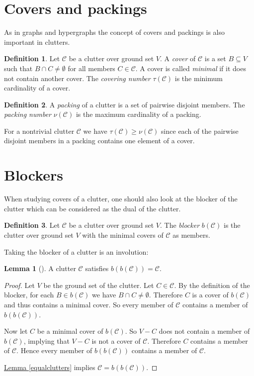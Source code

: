 \documentclass[a4paper, 12pt]{scrbook}
\theoremstyle{definition}
\newtheorem*{definition}{Definition}
\newtheorem{lemma}[theorem]{Lemma}
\begin{document}
\section{Covers and packings}
As in graphs and hypergraphs the concept of covers and packings is also important in clutters.
\begin{definition}
    Let $\mathcal{C}$ be a clutter over ground set $V$.
    A \emph{cover} of $\mathcal{C}$ is a set $B \subseteq V$ such that $B \cap C \neq \emptyset$ for all members $C \in \mathcal{C}$.
    A cover is called \emph{minimal} if it does not contain another cover.
    The \emph{covering number} $\tau(\mathcal{C})$ is the minimum cardinality of a cover.
\end{definition}

\begin{definition}
    A \emph{packing} of a clutter is a set of pairwise disjoint members.
    The \emph{packing number} $\nu(\mathcal{C})$ is the maximum cardinality of a packing.
\end{definition}

For a nontrivial clutter $\mathcal{C}$ we have $\tau(\mathcal{C}) \geq \nu(\mathcal{C})$ since each of the pairwise disjoint members in a packing contains one element of a cover.

\section{Blockers}
When studying covers of a clutter, one should also look at the blocker of the clutter which can be considered as the dual of the clutter.
\begin{definition}
    Let $\mathcal{C}$ be a clutter over ground set $V$.
    The \emph{blocker} $b(\mathcal{C})$ is the clutter over ground set $V$ with the minimal covers of $\mathcal{C}$ as members.
\end{definition}

Taking the blocker of a clutter is an involution:

\begin{lemma}[\cite{blocker}]
    A clutter $\mathcal{C}$ satisfies $b(b(\mathcal{C}))=\mathcal{C}$.
\end{lemma}

\begin{proof}
    Let $V$ be the ground set of the clutter.
    Let $C \in \mathcal{C}$.
    By the definition of the blocker, for each $B \in b(\mathcal{C})$ we have $B\cap C \neq \emptyset$.
    Therefore $C$ is a cover of $b(\mathcal{C})$ and thus contains a minimal cover.
    So every member of $\mathcal{C}$ contains a member of $b(b(\mathcal{C}))$.

    Now let $C$ be a minimal cover of $b(\mathcal{C})$.
    So $V-C$ does not contain a member of $b(\mathcal{C})$, implying that $V-C$ is not a cover of $\mathcal{C}$.
    Therefore $C$ contains a member of $\mathcal{C}$.
    Hence every member of $b(b(\mathcal{C}))$ contains a member of $\mathcal{C}$.

    \hyperref[equalclutters]{Lemma \ref*{equalclutters}} implies $\mathcal{C}=b(b(\mathcal{C}))$.
\end{proof}
\end{document}
